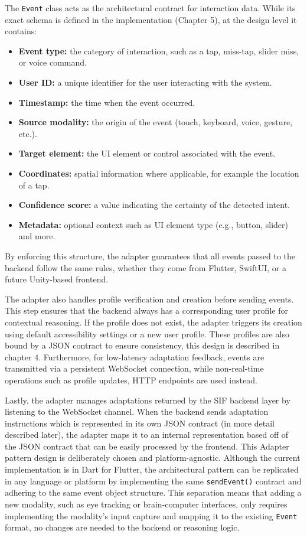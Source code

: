 \documentclass[openany]{book}
\begin{document}
The \texttt{Event} class acts as the architectural contract for interaction data. While its exact schema is defined in the implementation (Chapter 5), at the design level it contains:
\begin{itemize}
    \item \textbf{Event type:}  the category of interaction, such as a tap, miss-tap, slider miss, or voice command.
    \item \textbf{User ID:} a unique identifier for the user interacting with the system.
    \item \textbf{Timestamp:} the time when the event occurred.
    \item \textbf{Source modality:} the origin of the event (touch, keyboard, voice, gesture, etc.).
    \item \textbf{Target element:} the UI element or control associated with the event.
    \item \textbf{Coordinates:} spatial information where applicable, for example the location of a tap.
    \item \textbf{Confidence score:} a value indicating the certainty of the detected intent.
    \item \textbf{Metadata:} optional context such as UI element type (e.g., button, slider) and more.
\end{itemize}
By enforcing this structure, the adapter guarantees that all events passed to the backend follow the same rules, whether they come from Flutter, SwiftUI, or a future Unity-based frontend.

The adapter also handles profile verification and creation before sending events. This step ensures that the backend always has a corresponding user profile for contextual reasoning. If the profile does not exist, the adapter triggers its creation using default accessibility settings or a new user profile. These profiles are also bound by a JSON contract to ensure consistency, this design is described in chapter 4. Furthermore, for low-latency adaptation feedback, events are transmitted via a persistent WebSocket connection, while non-real-time operations such as profile updates, HTTP endpoints are used instead.

Lastly, the adapter manages adaptations returned by the SIF backend layer by listening to the WebSocket channel. When the backend sends adaptation instructions which is represented in its own JSON contract (in more detail described later), the adapter maps it to an internal representation based off of the JSON contract that can be easily processed by the frontend. This Adapter pattern design is deliberately chosen and platform-agnostic. Although the current implementation is in Dart for Flutter, the architectural pattern can be replicated in any language or platform by implementing the same \texttt{sendEvent()} contract and adhering to the same event object structure. This separation means that adding a new modality, such as eye tracking or brain-computer interfaces, only requires implementing the modality’s input capture and mapping it to the existing \texttt{Event} format, no changes are needed to the backend or reasoning logic.
\end{document}
